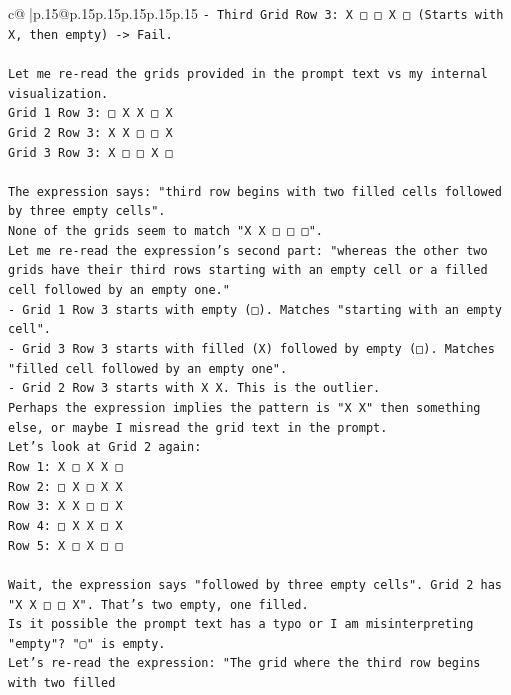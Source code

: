 \documentclass{article}
\begin{document}
{\begin{supertabular}{c@{$\;$}|p{.15\linewidth}@{}p{.15\linewidth}p{.15\linewidth}p{.15\linewidth}p{.15\linewidth}p{.15\linewidth}}
{{{\texttt{{-} Third Grid Row 3: X □ □ X □ (Starts with X, then empty) {-}> Fail.} \\
\\ 
\texttt{Let me re{-}read the grids provided in the prompt text vs my internal visualization.} \\
\texttt{Grid 1 Row 3: □ X X □ X} \\
\texttt{Grid 2 Row 3: X X □ □ X} \\
\texttt{Grid 3 Row 3: X □ □ X □} \\
\\ 
\texttt{The expression says: "third row begins with two filled cells followed by three empty cells".} \\
\texttt{None of the grids seem to match "X X □ □ □".} \\
\texttt{Let me re{-}read the expression's second part: "whereas the other two grids have their third rows starting with an empty cell or a filled cell followed by an empty one."} \\
\texttt{{-} Grid 1 Row 3 starts with empty (□). Matches "starting with an empty cell".} \\
\texttt{{-} Grid 3 Row 3 starts with filled (X) followed by empty (□). Matches "filled cell followed by an empty one".} \\
\texttt{{-} Grid 2 Row 3 starts with X X. This is the outlier.} \\
\texttt{Perhaps the expression implies the pattern is "X X" then something else, or maybe I misread the grid text in the prompt.} \\
\texttt{Let's look at Grid 2 again:} \\
\texttt{Row 1: X □ X X □} \\
\texttt{Row 2: □ X □ X X} \\
\texttt{Row 3: X X □ □ X} \\
\texttt{Row 4: □ X X □ X} \\
\texttt{Row 5: X □ X □ □} \\
\\ 
\texttt{Wait, the expression says "followed by three empty cells". Grid 2 has "X X □ □ X". That's two empty, one filled.} \\
\texttt{Is it possible the prompt text has a typo or I am misinterpreting "empty"? "▢" is empty.} \\
\texttt{Let's re{-}read the expression: "The grid where the third row begins with two filled} \\
\\ 
\\ 
}}}
\end{supertabular}}
\end{document}
